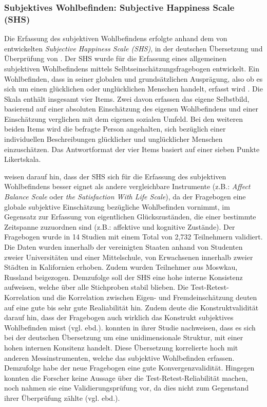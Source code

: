 \subsubsection{Subjektives Wohlbefinden: Subjective Happiness Scale (SHS)}\label{sec:SWB}
Die Erfassung des subjektiven Wohlbefindens erfolgte anhand dem von  entwickelten \textit{Subjective Happiness Scale (SHS)}, in der deutschen Übersetzung und Überprüfung von . Der SHS wurde für die Erfassung  eines allgemeinen subjektiven Wohlbefindens mittels Selbtseinschätzungsfragebogen entwickelt. Ein Wohlbefinden, dass in seiner globalen und grundsätzlichen Ausprägung, also ob es sich um einen glücklichen oder unglücklichen Menschen handelt, erfasst wird  \cite[S.~139ff]{Lyubomirsky1999}. Die Skala enthält insgesamt vier Items. Zwei davon erfassen das eigene Selbstbild, basierend auf einer absoluten Einschätzung des eigenen Wohlbefindens und einer Einschätzung verglichen mit dem eigenen sozialen Umfeld. Bei den weiteren beiden Items wird die befragte Person angehalten, sich bezüglich einer individuellen Beschreibungen glücklicher und unglücklicher Menschen einzuschätzen. Das Antwortformat der vier Items basiert auf einer sieben Punkte Likertskala. 

 weisen darauf hin, dass der SHS sich für die Erfassung des subjektiven Wohlbefindens besser eignet als andere vergleichbare Instrumente (z.B.: \textit{Affect Balance Scale} oder \textit{the Satisfaction With Life Scale}), da der Fragebogen eine globale subjektive Einschätzung bezügliche Wohlbefinden vornimmt, im Gegensatz zur Erfassung von eigentlichen Glückszuständen, die einer bestimmte Zeitspanne zuzuordnen sind (z.B.: affektive und kognitive Zustände). Der Fragebogen wurde in 14 Studien mit einem Total von 2,732 Teilnehmern validiert. Die Daten wurden innerhalb der vereinigten Staaten anhand von Studenten zweier Universitäten und einer Mittelschule, von Erwachsenen innerhalb zweier Städten in Kalifornien   erhoben. Zudem wurden Teilnehmer aus Moswkau, Russland beigezogen. Demzufolge soll der SHS eine hohe interne Konsistenz aufweisen, welche über alle Stichproben stabil blieben. Die Test-Retest-Korrelation und die Korrelation zwischen Eigen- und Fremdeinschätzung deuten auf eine gute bis sehr gute Realiabilität hin. 
Zudem deute die Konstruktvalidität darauf hin, dass der Fragebogen auch wirklich das Konstrukt subjektives Wohlbefinden misst (vgl. ebd.).  konnten in ihrer Studie nachweisen, dass es sich bei der deutschen Übersetzung um eine unidimensionale Struktur, mit einer hohen internen Konsitenz handelt. Diese Übersetzung korrelierte hoch mit anderen Messinstrumenten, welche das subjektive Wohlbefinden erfassen. Demzufolge habe der neue Fragebogen eine gute Konvergenzvalidität. Hingegen konnten die Forscher keine Aussage über die Test-Retest-Reliabilität machen, noch nahmen sie eine Validierungsprüfung vor, da dies nicht zum Gegenstand ihrer Überprüfung zählte (vgl. ebd.).

